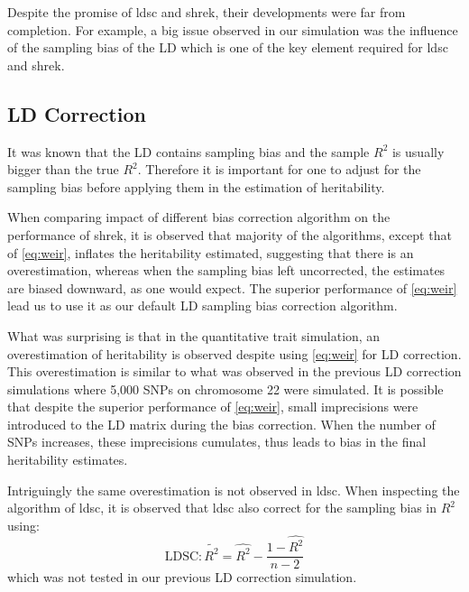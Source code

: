 \documentclass[12pt]{scrbook}
\begin{document}
Despite the promise of \gls{ldsc} and \gls{shrek}, their developments were far from completion.
For example, a big issue observed in our simulation was the influence of the sampling bias of the \gls{LD} which is one of the key element required for \gls{ldsc} and \gls{shrek}.

\subsection{LD Correction}
It was known that the \gls{LD} contains sampling bias and the sample $R^2$ is usually bigger than the true $R^2$.
Therefore it is important for one to adjust for the sampling bias before applying them in the estimation of heritability.

When comparing impact of different bias correction algorithm on the performance of \gls{shrek}, it is observed that majority of the algorithms, except that of \cref{eq:weir}, inflates the heritability estimated, suggesting that there is an overestimation, whereas when the sampling bias left uncorrected, the estimates are biased downward, as one would expect.
The superior performance of \cref{eq:weir} lead us to use it as our default \gls{LD} sampling bias correction algorithm.

What was surprising is that in the quantitative trait simulation, an overestimation of heritability is observed despite using \cref{eq:weir} for \gls{LD} correction.
This overestimation is similar to what was observed in the previous \gls{LD} correction simulations where 5,000 \glspl{SNP} on chromosome 22 were simulated.
It is possible that despite the superior performance of \cref{eq:weir}, small imprecisions were introduced to the \gls{LD} matrix during the bias correction.
When the number of \glspl{SNP} increases, these imprecisions cumulates, thus leads to bias in the final heritability estimates.

Intriguingly the same overestimation is not observed in \gls{ldsc}.
When inspecting the algorithm of \gls{ldsc}, it is observed that \gls{ldsc} also correct for the sampling bias in $R^2$ using:
\begin{equation}
\text{LDSC}: \tilde{R^2}= \hat{R^2}-\frac{1-\hat{R^2}}{n-2}\label{eq:ldscR2} 
\end{equation}
which was not tested in our previous \gls{LD} correction simulation.
\end{document}
